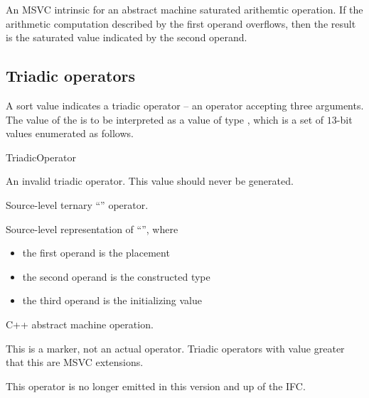 An MSVC intrinsic for an abstract machine saturated arithemtic operation. 
If the arithmetic computation described by the first operand overflows, 
then the result is the saturated value indicated by the second operand.


\subsection{Triadic operators}
\label{sec:ifc:OperatorSort:Triadic}

A sort value  indicates a triadic operator -- 
an operator accepting three arguments.  The
value of the  is to be interpreted as a value of type 
, which is a set of $13$-bit values enumerated as follows.
%
\begin{Enumeration}{TriadicOperator}

	\setcounter{enumi}{1023}
	\setcounter{enumi}{4063}
\end{Enumeration}

An invalid triadic operator.  This value should never be generated.

Source-level ternary ``'' operator.

Source-level representation of ``'', where
\begin{itemize}
	\item the first operand is the placement 
	\item the second operand is the constructed type 
	\item the third operand is the initializing value 
\end{itemize}


C++ abstract machine operation.

This is a marker, not an actual operator. Triadic operators with 
value greater that this are MSVC extensions.

This operator is no longer emitted in this version and up of the IFC.

